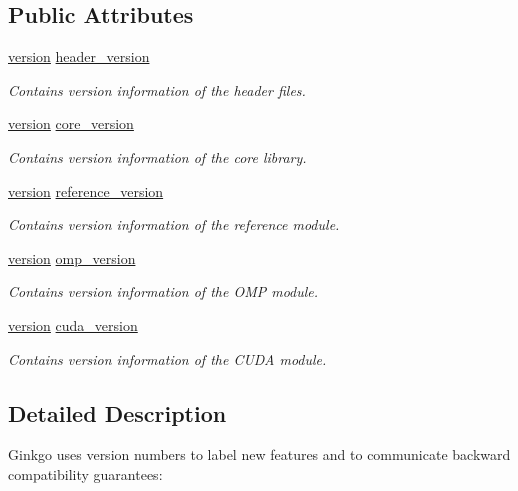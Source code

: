 \subsection*{Public Attributes}
\begin{DoxyCompactItemize}
\item 
\mbox{\label{classgko_1_1version__info_a5b8240b191920dc3688ccfbbd8ae3378}} 
\hyperlink{structgko_1_1version}{version} \hyperlink{classgko_1_1version__info_a5b8240b191920dc3688ccfbbd8ae3378}{header\+\_\+version}
\begin{DoxyCompactList}\small\item\em Contains version information of the header files. \end{DoxyCompactList}\item 
\hyperlink{structgko_1_1version}{version} \hyperlink{classgko_1_1version__info_a85dd2724c9c37cb7f315a99dc03f0d72}{core\+\_\+version}
\begin{DoxyCompactList}\small\item\em Contains version information of the core library. \end{DoxyCompactList}\item 
\hyperlink{structgko_1_1version}{version} \hyperlink{classgko_1_1version__info_a772fcf25f93d719b733602b4bba7d7ec}{reference\+\_\+version}
\begin{DoxyCompactList}\small\item\em Contains version information of the reference module. \end{DoxyCompactList}\item 
\hyperlink{structgko_1_1version}{version} \hyperlink{classgko_1_1version__info_a795e1a6f8bdb0a4157b2d52b92e7b44e}{omp\+\_\+version}
\begin{DoxyCompactList}\small\item\em Contains version information of the O\+MP module. \end{DoxyCompactList}\item 
\hyperlink{structgko_1_1version}{version} \hyperlink{classgko_1_1version__info_a75d283ac87b2f80abdc48fa48b3a5d51}{cuda\+\_\+version}
\begin{DoxyCompactList}\small\item\em Contains version information of the C\+U\+DA module. \end{DoxyCompactList}\end{DoxyCompactItemize}


\subsection{Detailed Description}
Ginkgo uses version numbers to label new features and to communicate backward compatibility guarantees\+: 


